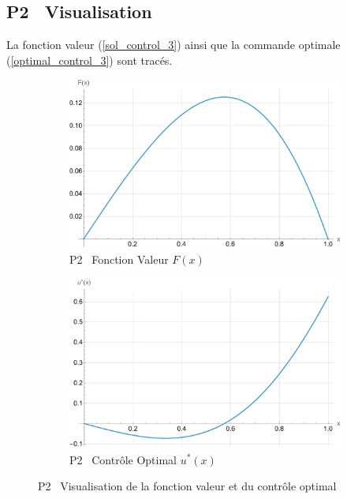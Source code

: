 \subsection{P2 \textemdash~Visualisation}
La fonction valeur (\ref{sol_control_3}) ainsi que la commande optimale (\ref{optimal_control_3}) sont tracés.
\begin{figure}[htb]
    \centering
    \begin{subfigure}{0.45\linewidth}
        \includegraphics[width=\linewidth]{img/validation/P3/p3_value.pdf}
        \caption{P2 \textemdash~Fonction Valeur $F(x)$}\label{fig:ValueVisualisation3}
    \end{subfigure}
    \hfill
    \begin{subfigure}{0.45\linewidth}
        \includegraphics[width=\linewidth]{img/validation/P3/p3_control.pdf}
        \caption{P2 \textemdash~Contrôle Optimal $u^*(x)$}\label{fig:ControlVisualisation3}
    \end{subfigure}
    \caption{P2 \textemdash~Visualisation de la fonction valeur et du contrôle optimal}\label{fig:ValueControlComparison3}
\end{figure}
